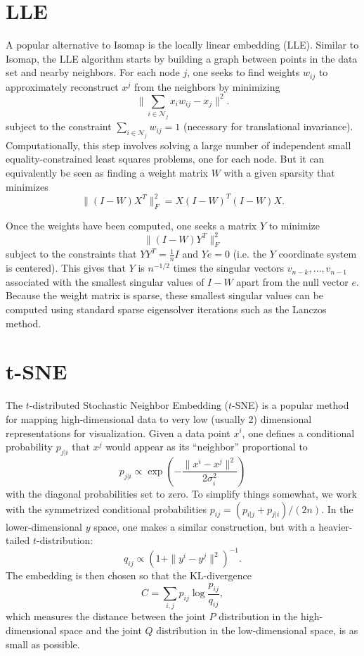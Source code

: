 \documentclass[12pt, leqno]{article} %
\begin{document}
\section{LLE}


A popular alternative to Isomap is the locally linear embedding
(LLE).  Similar to Isomap, the LLE algorithm starts by building a
graph between points in the data set and nearby neighbors.  For each
node $j$, one seeks to find weights $w_{ij}$ to approximately
reconstruct $x^j$ from the neighbors by minimizing
\[
  \|\sum_{i \in \mathcal{N}_j} x_i w_{ij} - x_j\|^2.
\]
subject to the constraint $\sum_{i \in \mathcal{N}_j} w_{ij} = 1$
(necessary for translational invariance).
Computationally, this step involves solving a large number of
independent small equality-constrained least squares problems, one for
each node.  But it can equivalently be seen as finding a weight matrix
$W$ with a given sparsity that minimizes
\[
  \|(I-W)X^T\|_F^2 = X(I-W)^T (I-W) X.
\]

Once the weights have been computed, one seeks a matrix $Y$ to
minimize
\[
  \|(I-W) Y^T\|_F^2
\]
subject to the constraints that $YY^T = \frac{1}{n} I$ and $Ye = 0$
(i.e. the $Y$ coordinate system is centered).  This gives that $Y$
is $n^{-1/2}$ times the singular vectors $v_{n-k}, \ldots, v_{n-1}$
associated with the smallest singular values of $I-W$ apart from
the null vector $e$.  Because the weight matrix is sparse, these
smallest singular values can be computed using standard sparse
eigensolver iterations such as the Lanczos method.

\section{t-SNE}


The $t$-distributed Stochastic Neighbor Embedding ($t$-SNE) is a
popular method for mapping high-dimensional data to very low
(usually 2) dimensional representations for visualization.
Given a data point $x^i$, one defines a conditional probability
$p_{j|i}$ that $x^j$ would appear as its ``neighbor'' proportional to
\[
  p_{j|i} \propto \exp\left(-\frac{\|x^i-x^j\|^2}{2\sigma_i^2} \right)
\]
with the diagonal probabilities set to zero.  To simplify things
somewhat, we work with the symmetrized conditional probabilities
$p_{ij} = (p_{i|j} + p_{j|i})/(2n)$.  In the lower-dimensional $y$
space, one makes a similar construction, but with a heavier-tailed
$t$-distribution:
\[
  q_{ij} \propto (1+\|y^i-y^j\|^2)^{-1}.
\]
The embedding is then chosen so that the KL-divergence
\[
  C = \sum_{i,j} p_{ij} \log \frac{p_{ij}}{q_{ij}},
\]
which measures the distance between the joint $P$ distribution in the
high-dimensional space and the joint $Q$ distribution in the
low-dimensional space, is as small as possible.
\end{document}
